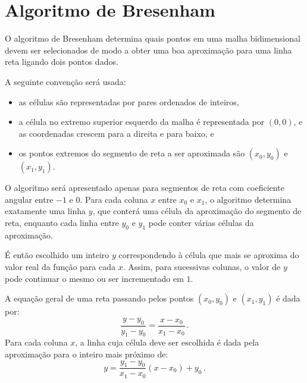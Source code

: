 %
%
%

\section{Algoritmo de Bresenham} \label{sse:bresenham_line}
O algoritmo de Bresenham determina quais pontos em uma malha
bidimensional devem ser selecionados de modo a obter uma boa aproximação
para uma linha reta ligando dois pontos dados.

A seguinte convenção será usada:
\begin{itemize}
\item as células são representadas por pares ordenados de inteiros,
\item a célula no extremo superior esquerdo da malha é representada por
$(0,0)$, e as coordenadas crescem para a direita e para baixo, e
\item os pontos extremos do segmento de reta a ser aproximada são $(x_0,y_0)$
e  $(x_1,y_1)$.
\end{itemize}

O algoritmo será apresentado apenas para segmentos de reta com coeficiente
angular entre $-1$ e $0$. Para cada coluna $x$ entre $x_0$
e $x_1$, o algoritmo determina exatamente uma linha $y$, que conterá uma célula
da aproximação do segmento de reta, enquanto cada linha entre $y_0$ e $y_1$
pode conter várias células da aproximação.

É então escolhido um inteiro $y$ correspondendo à célula
que mais se aproxima do valor real da função para cada $x$. Assim, para
sucessivas colunas, o valor de $y$ pode continuar o mesmo ou ser incrementado
em $1$.

A equação geral de uma reta passando pelos pontos $(x_0,y_0)$ e  $(x_1,y_1)$
é dada por:
\begin{equation*}
\frac{y-y_0}{y_1-y_0}=\frac{x-x_0}{x_1-x_0}\,.
\end{equation*}
Para cada coluna $x$, a linha cuja célula deve ser escolhida é dada pela
aproximação para o inteiro mais próximo de:
\begin{equation*}
y=\frac{y_1-y_0}{x_1-x_0}(x-x_0) + y_0\,.
\end{equation*}

